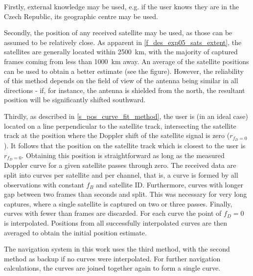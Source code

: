 Firstly, external knowledge may be used, e.g. if the user knows they are in the Czech Republic, its geographic centre may be used.

Secondly, the position of any received satellite may be used, as those can be assumed to be relatively close. As apparent in \autoref{f_des_exp05_sats_extent}, the satellites are generally located within \qty{2500}{km}, with the majority of captured frames coming from less than \qty{1000}{km} away. An average of the satellite positions can be used to obtain a better estimate (see the figure). However, the reliability of this method depends on the field of view of the antenna being similar in all directions - if, for instance, the antenna is shielded from the north, the resultant position will be significantly shifted southward.

Thirdly, as described in \autoref{s_pos_curve_fit_method}, the user is (in an ideal case) located on a line perpendicular to the satellite track, intersecting the satellite track at the position where the Doppler shift of the satellite signal is zero ($r_{f_D = 0}$). It follows that the position on the satellite track which is closest to the user is $r_{f_D = 0}$. Obtaining this position is straightforward as long as the measured Doppler curve for a given satellite passes through zero.
The received data are split into curves per satellite and per channel, that is, a curve is formed by all observations with constant $f_B$ and satellite ID. Furthermore, curves with longer gap between two frames than  seconds and split.
This was necessary for very long captures, where a single satellite is captured on two or three passes. Finally, curves with fewer than  frames are discarded. For each curve the point of $f_D = 0$ is interpolated. Positions from all successfully interpolated curves are then averaged to obtain the initial position estimate.

The navigation system in this work uses the third method, with the second method as backup if no curves were interpolated. %
For further navigation calculations, the curves are joined together again to form a single curve.


